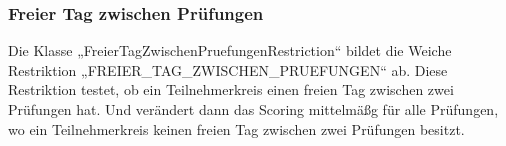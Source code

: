 \subsubsection{Freier Tag zwischen Prüfungen}\label{subsubsec:freierTagZwischenPruefungen}
Die Klasse „FreierTagZwischenPruefungenRestriction“ bildet die Weiche Restriktion „FREIER\_TAG\_ZWISCHEN\_PRUEFUNGEN“ ab.
Diese Restriktion testet, ob ein Teilnehmerkreis einen freien Tag zwischen zwei Prüfungen hat.
Und verändert dann das Scoring mittelmäßg für alle Prüfungen, wo ein Teilnehmerkreis keinen freien Tag zwischen zwei Prüfungen besitzt.